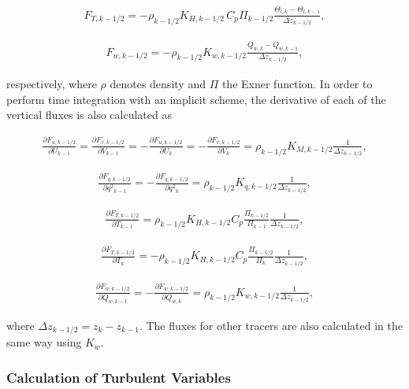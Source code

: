 \begin{eqnarray}F_{T,k-1/2}=-\rho_{k-1/2}K_{H,k-1/2}\,C_p\Pi_{k-1/2}\frac{\Theta_{l,k}-\Theta_{l,k-1}}{\Delta z_{k-1/2}},\end{eqnarray}

\begin{eqnarray}F_{w,k-1/2}=-\rho_{k-1/2}K_{w,k-1/2}\frac{Q_{w,k}-Q_{w,k-1}}{\Delta z_{k-1/2}},\end{eqnarray}

respectively, where \(\rho\) denotes density and \(\Pi\) the Exner
function. In order to perform time integration with an implicit scheme,
the derivative of each of the vertical fluxes is also calculated as

\begin{eqnarray}\frac{\partial F_{u,k-1/2}}{\partial U_{k-1}}=\frac{\partial F_{v,k-1/2}}{\partial V_{k-1}}=-\frac{\partial F_{u,k-1/2}}{\partial U_{k}}=-\frac{\partial F_{v,k-1/2}}{\partial V_{k}}=\rho_{k-1/2}K_{M,k-1/2}\frac{1}{\Delta z_{k-1/2}},\end{eqnarray}

\begin{eqnarray}\frac{\partial F_{q,k-1/2}}{\partial {q^2}_ {k-1}}=-\frac{\partial F_{q,k-1/2}}{\partial {q^2}_ {k}}=\rho_{k-1/2}K_{q,k-1/2}\frac{1}{\Delta z_{k-1/2}},\end{eqnarray}

\begin{eqnarray}\frac{\partial F_{T,k-1/2}}{\partial T_{k-1}}=\rho_{k-1/2}K_{H,k-1/2}C_p\frac{\Pi_{k-1/2}}{\Pi_{k-1}}\frac{1}{\Delta z_{k-1/2}},\end{eqnarray}

\begin{eqnarray}\frac{\partial F_{T,k-1/2}}{\partial T_{k}}=-\rho_{k-1/2}K_{H,k-1/2}C_p\frac{\Pi_{k-1/2}}{\Pi_{k}}\frac{1}{\Delta z_{k-1/2}},\end{eqnarray}

\begin{eqnarray}\frac{\partial F_{w,k-1/2}}{\partial Q_{w,k-1}}=-\frac{\partial F_{w,k-1/2}}{\partial Q_{w,k}}=\rho_{k-1/2}K_{w,k-1/2}\frac{1}{\Delta z_{k-1/2}},\end{eqnarray}

where \(\Delta z_{k-1/2}=z_k-z_{k-1}\). The fluxes for other tracers are
also calculated in the same way using \(K_w\).

\hypertarget{calculation-of-turbulent-variables}{%
\subsubsection{Calculation of Turbulent
Variables}\label{calculation-of-turbulent-variables}}

